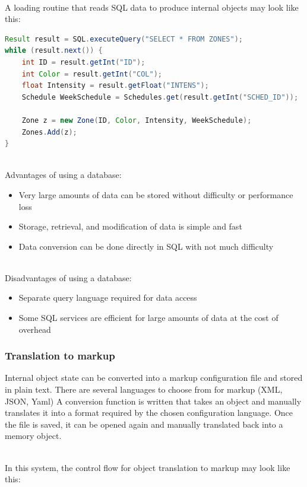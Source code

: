 \documentclass[onecolumn, draftclsnofoot,10pt, compsoc]{IEEEtran}
\begin{document}
		\noindent \\A loading routine that reads SQL data to produce internal objects may look like this:

	\begin{lstlisting}[language=JAVA]
Result result = SQL.executeQuery("SELECT * FROM ZONES");
while (result.next()) {
	int ID = result.getInt("ID");
	int Color = result.getInt("COL");
	float Intensity = result.getFloat("INTENS");
	Schedule WeekSchedule = Schedules.get(result.getInt("SCHED_ID"));

	Zone z = new Zone(ID, Color, Intensity, WeekSchedule);
	Zones.Add(z);
}
\end{lstlisting}

\noindent \\Advantages of using a database:
\begin{itemize}
	\item Very large amounts of data can be stored without difficulty or performance loss
	\item Storage, retrieval, and modification of data is simple and fast
	\item Data conversion can be done directly in SQL with not much difficulty
\end{itemize}

\noindent \\Disadvantages of using a database:
\begin{itemize}
	\item Separate query language required for data access
	\item Some SQL services are efficient for large amounts of data at the cost of overhead
\end{itemize}


		\subsubsection{Translation to markup}
		Internal object state can be converted into a markup configuration file and stored in plain text.
		There are several languages to choose from for markup (XML, JSON, Yaml) \cite{config1}
		A conversion function is written that takes an object and manually translates it into a format required by the chosen configuration language.
		Once the file is saved, it can be opened again and manually translated back into a memory object.

		\noindent \\In this system, the control flow for object translation to markup may look like this:
\end{document}

